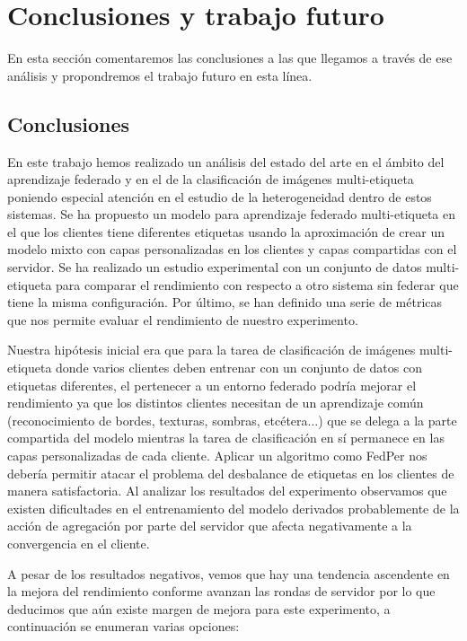 \chapter{Conclusiones y trabajo futuro} \label{cap5}

\vspace*{5mm}


En esta sección comentaremos las conclusiones a las que llegamos a través de ese análisis y propondremos el trabajo futuro en esta línea.

\section{Conclusiones}

En este trabajo hemos realizado un análisis del estado del arte en el ámbito del aprendizaje federado y en el de la clasificación de imágenes multi-etiqueta poniendo especial atención en el estudio de la heterogeneidad dentro de estos sistemas. Se ha propuesto un modelo para aprendizaje federado multi-etiqueta en el que los clientes tiene diferentes etiquetas usando la aproximación de crear un modelo mixto con capas personalizadas en los clientes y capas compartidas con el servidor. Se ha realizado un estudio experimental con un conjunto de datos multi-etiqueta para comparar el rendimiento con respecto a otro sistema sin federar que tiene la misma configuración. Por último, se han definido una serie de métricas que nos permite evaluar el rendimiento de nuestro experimento.

Nuestra hipótesis inicial era que para la tarea de clasificación de imágenes multi-etiqueta donde varios clientes deben entrenar con un conjunto de datos con etiquetas diferentes, el pertenecer a un entorno federado podría mejorar el rendimiento ya que los distintos clientes necesitan de un aprendizaje común (reconocimiento de bordes, texturas, sombras, etcétera...) que se delega a la parte compartida del modelo mientras la tarea de clasificación en sí permanece en las capas personalizadas de cada cliente. Aplicar un algoritmo como FedPer nos debería permitir atacar el problema del desbalance de etiquetas en los clientes de manera satisfactoria. Al analizar los resultados del experimento observamos que existen dificultades en el entrenamiento del modelo derivados probablemente de la acción de agregación por parte del servidor que afecta negativamente a la convergencia en el cliente. 

A pesar de los resultados negativos, vemos que hay una tendencia ascendente en la mejora del rendimiento conforme avanzan las rondas de servidor por lo que deducimos que aún existe margen de mejora para este experimento, a continuación se enumeran varias opciones:

